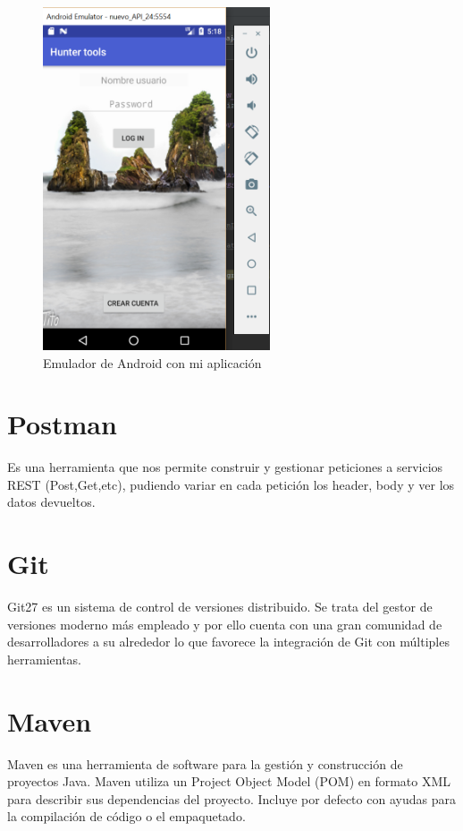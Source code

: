 \begin{figure}
		\centering
		\includegraphics[width=0.6\textwidth] {emulador.png}
		\caption{Emulador de Android con mi aplicación}
		\label{fig:emulador}
	\end{figure}
 




\section{Postman}

Es una herramienta que nos permite construir y gestionar peticiones a servicios REST (Post,Get,etc), pudiendo variar en cada petición los header, body y ver los datos devueltos.


\section{Git}
Git27 es un sistema de control de versiones distribuido. Se trata del gestor de versiones moderno
más empleado y por ello cuenta con una gran comunidad de desarrolladores a su alrededor lo
que favorece la integración de Git con múltiples herramientas.
\section{Maven}
Maven es una herramienta de software para la gestión y construcción de proyectos Java.
 Maven utiliza un Project Object Model (POM) en formato
XML para describir sus dependencias del proyecto. Incluye por defecto con ayudas para la compilación de código o el empaquetado.







